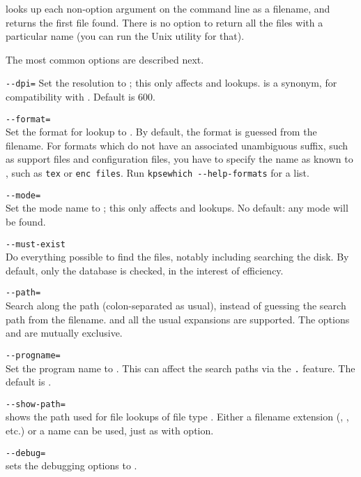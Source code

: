 \documentclass{article}
\begin{document}
\KPS{} looks up each non-option argument on the command line as a
filename, and returns the first file found. There is no option to
return all the files with a particular name (you can run the Unix
 utility for that).

The most common options are described next.

\begin{ttdescription}
\item[\texttt{-{}-dpi=\var{num}}]\mbox{}
  Set the resolution to ; this only affects 
  and  lookups.   is a synonym, for compatibility
  with .  Default is 600.

\item[\texttt{-{}-format=\var{name}}]\mbox{}\\
  Set the format for lookup to .  By default, the
  format is guessed from the filename. For formats which do not have
  an associated unambiguous suffix, such as \MP{} support files and
   configuration files, you have to specify the name as
  known to \KPS{}, such as \texttt{tex} or \texttt{enc files}.  Run
  \texttt{kpsewhich -{}-help-formats} for a list.

\item[\texttt{-{}-mode=\var{string}}]\mbox{}\\
  Set the mode name to ; this only affects 
  and  lookups.  No default: any mode will be found.
\item[\texttt{-{}-must-exist}]\mbox{}\\
  Do everything possible to find the files, notably including
  searching the disk.  By default, only the  database is
  checked, in the interest of efficiency.
\item[\texttt{-{}-path=\var{string}}]\mbox{}\\
  Search along the path  (colon-separated as usual),
  instead of guessing the search path from the filename.  \samp{//} and
  all the usual expansions are supported.  The options 
  and  are mutually exclusive.
\item[\texttt{-{}-progname=\var{name}}]\mbox{}\\
  Set the program name to \texttt{}.
  This can affect the search paths via the \texttt{.}
  feature.
  The default is .
\item[\texttt{-{}-show-path=\var{name}}]\mbox{}\\
  shows the path used for file lookups of file type \texttt{}.
  Either a filename extension (, , etc.) or a
  name can be used, just as with  option.
\item[\texttt{-{}-debug=\var{num}}]\mbox{}\\
  sets the debugging options to \texttt{}.
\end{ttdescription}
\end{document}
